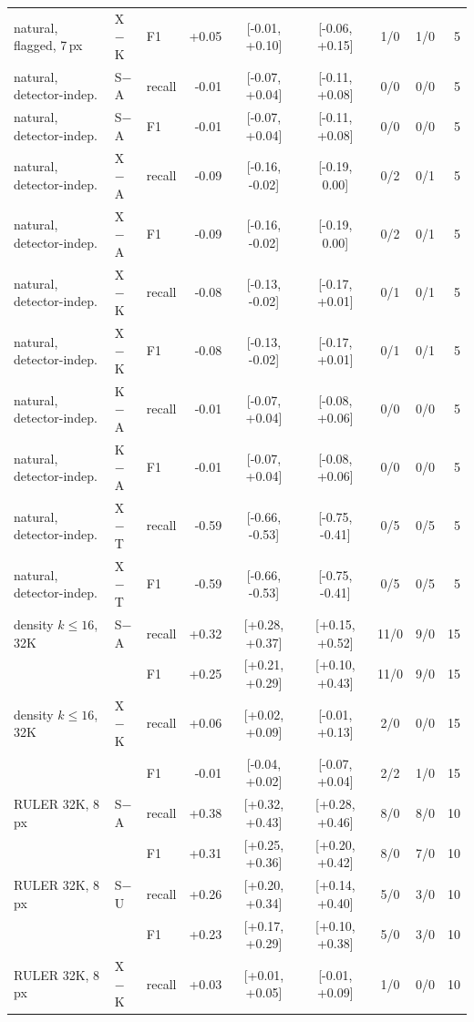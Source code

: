 \begin{table}[!htbp]
\begin{tabular}{l l l r c c c c r}
natural, flagged, 7\,px & X$-$K & F1 & +0.05 & [-0.01, +0.10] & [-0.06, +0.15] & 1/0 & 1/0 & 5 \\
natural, detector-indep. & S$-$A & recall & -0.01 & [-0.07, +0.04] & [-0.11, +0.08] & 0/0 & 0/0 & 5 \\
natural, detector-indep. & S$-$A & F1 & -0.01 & [-0.07, +0.04] & [-0.11, +0.08] & 0/0 & 0/0 & 5 \\
natural, detector-indep. & X$-$A & recall & -0.09 & [-0.16, -0.02] & [-0.19, 0.00] & 0/2 & 0/1 & 5 \\
natural, detector-indep. & X$-$A & F1 & -0.09 & [-0.16, -0.02] & [-0.19, 0.00] & 0/2 & 0/1 & 5 \\
natural, detector-indep. & X$-$K & recall & -0.08 & [-0.13, -0.02] & [-0.17, +0.01] & 0/1 & 0/1 & 5 \\
natural, detector-indep. & X$-$K & F1 & -0.08 & [-0.13, -0.02] & [-0.17, +0.01] & 0/1 & 0/1 & 5 \\
natural, detector-indep. & K$-$A & recall & -0.01 & [-0.07, +0.04] & [-0.08, +0.06] & 0/0 & 0/0 & 5 \\
natural, detector-indep. & K$-$A & F1 & -0.01 & [-0.07, +0.04] & [-0.08, +0.06] & 0/0 & 0/0 & 5 \\
natural, detector-indep. & X$-$T & recall & -0.59 & [-0.66, -0.53] & [-0.75, -0.41] & 0/5 & 0/5 & 5 \\
natural, detector-indep. & X$-$T & F1 & -0.59 & [-0.66, -0.53] & [-0.75, -0.41] & 0/5 & 0/5 & 5 \\
density $k\le16$, 32K & S$-$A & recall & +0.32 & [+0.28, +0.37] & [+0.15, +0.52] & 11/0 & 9/0 & 15 \\
 &  & F1 & +0.25 & [+0.21, +0.29] & [+0.10, +0.43] & 11/0 & 9/0 & 15 \\
density $k\le16$, 32K & X$-$K & recall & +0.06 & [+0.02, +0.09] & [-0.01, +0.13] & 2/0 & 0/0 & 15 \\
 &  & F1 & -0.01 & [-0.04, +0.02] & [-0.07, +0.04] & 2/2 & 1/0 & 15 \\
RULER 32K, 8\,px & S$-$A & recall & +0.38 & [+0.32, +0.43] & [+0.28, +0.46] & 8/0 & 8/0 & 10 \\
 &  & F1 & +0.31 & [+0.25, +0.36] & [+0.20, +0.42] & 8/0 & 7/0 & 10 \\
RULER 32K, 8\,px & S$-$U & recall & +0.26 & [+0.20, +0.34] & [+0.14, +0.40] & 5/0 & 3/0 & 10 \\
 &  & F1 & +0.23 & [+0.17, +0.29] & [+0.10, +0.38] & 5/0 & 3/0 & 10 \\
RULER 32K, 8\,px & X$-$K & recall & +0.03 & [+0.01, +0.05] & [-0.01, +0.09] & 1/0 & 0/0 & 10 \\

\end{tabular}
\end{table}
